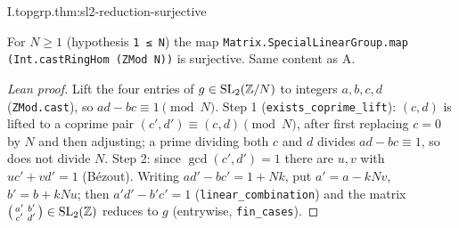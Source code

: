 \begin{theorem}[$\SL_2(\Z)\to\SL_2(\Z/N)$ is surjective]
\end{theorem}
\begin{tfformal}{I.topgrp.thm:sl2-reduction-surjective}
\begin{tffidelity}
For $N\ge1$ (hypothesis \texttt{1 ≤ N}) the map \texttt{Matrix.SpecialLinearGroup.map (Int.castRingHom (ZMod N))} is surjective. Same content as A.
\end{tffidelity}
\end{tfformal}
\begin{proof}[Lean proof]
Lift the four entries of $g\in\mathrm{SL}_2(\mathbb{Z}/N)$ to integers $a,b,c,d$ (\texttt{ZMod.cast}), so $ad-bc\equiv1\pmod N$. Step 1 (\texttt{exists\_coprime\_lift}): $(c,d)$ is lifted to a coprime pair $(c',d')\equiv(c,d)\pmod N$, after first replacing $c=0$ by $N$ and then adjusting; a prime dividing both $c$ and $d$ divides $ad-bc\equiv1$, so does not divide $N$. Step 2: since $\gcd(c',d')=1$ there are $u,v$ with $uc'+vd'=1$ (B\'ezout). Writing $ad'-bc'=1+Nk$, put $a'=a-kNv$, $b'=b+kNu$; then $a'd'-b'c'=1$ (\texttt{linear\_combination}) and the matrix $\begin{psmallmatrix}a'&b'\\c'&d'\end{psmallmatrix}\in\mathrm{SL}_2(\mathbb{Z})$ reduces to $g$ (entrywise, \texttt{fin\_cases}).
\end{proof}


